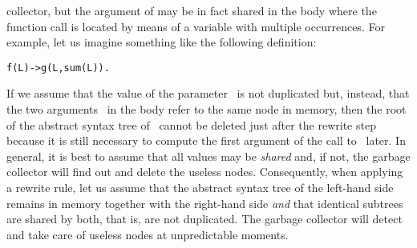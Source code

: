 collector, but the argument of  may be in fact shared
in the body where the function call is located by means of a variable
with multiple occurrences. For example, let us imagine something like
the following definition:
\begin{alltt}
f(L) -> g(L,sum(L)).\hfill% \emph{Variable} L \emph{is repeated.}
\end{alltt}
If we assume that the value of the parameter~ is not
duplicated but, instead, that the two arguments~ in the
body refer to the same node in memory, then the root of the abstract
syntax tree of~ cannot be deleted just after the rewrite
step~\clause{\beta} because it is still necessary to compute the first
argument of the call to~ later. In general, it is best to
assume that all values may be \emph{shared} and, if not, the garbage
collector will find out and delete the useless nodes. Consequently,
when applying a rewrite rule, let us assume that the abstract syntax
tree of the left\hyp{}hand side remains in memory together with the
right\hyp{}hand side \emph{and} that identical subtrees are shared by
both, that is, are not duplicated. The garbage collector will detect
and take care of useless nodes at unpredictable moments.

